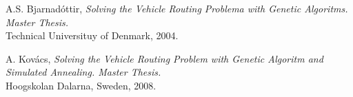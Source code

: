 \documentclass[conference]{IEEEtran}
\begin{document}




%
%
%
\begin{thebibliography}{1}

A.S. Bjarnadóttir, \emph{Solving the Vehicle Routing Problema with Genetic Algoritms.  Master Thesis.}\\
Technical Universituy of Denmark, 2004.

A. Kovács, \emph{Solving the Vehicle Routing Problem with Genetic Algoritm and Simulated Annealing. Master Thesis.}\\
Hoogskolan Dalarna, Sweden, 2008.

\end{thebibliography}




\end{document}
